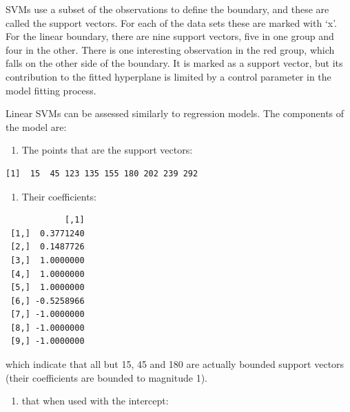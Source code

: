 \documentclass[
  letterpaper,
]{krantz}
\newenvironment{Shaded}{\begin{snugshade}}{\end{snugshade}}
\newcommand{\NormalTok}[1]{\textcolor[rgb]{0.00,0.23,0.31}{#1}}
\newcommand{\SpecialCharTok}[1]{\textcolor[rgb]{0.37,0.37,0.37}{#1}}
\providecommand{\tightlist}{%
  \setlength{\itemsep}{0pt}\setlength{\parskip}{0pt}}
\begin{document}
SVMs use a subset of the observations to define the boundary, and these
are called the support vectors. For each of the data sets these are
marked with `x'. For the linear boundary, there are nine support
vectors, five in one group and four in the other. There is one
interesting observation in the red group, which falls on the other side
of the boundary. It is marked as a support vector, but its contribution
to the fitted hyperplane is limited by a control parameter in the model
fitting process.

Linear SVMs can be assessed similarly to regression models. The
components of the model are:

\begin{enumerate}
\def\labelenumi{\arabic{enumi}.}
\tightlist
\item
  The points that are the support vectors:
\end{enumerate}

\begin{Shaded}
\end{Shaded}

\begin{verbatim}
[1]  15  45 123 135 155 180 202 239 292
\end{verbatim}

\begin{enumerate}
\def\labelenumi{\arabic{enumi}.}
\setcounter{enumi}{1}
\tightlist
\item
  Their coefficients:
\end{enumerate}

\begin{Shaded}
\end{Shaded}

\begin{verbatim}
            [,1]
 [1,]  0.3771240
 [2,]  0.1487726
 [3,]  1.0000000
 [4,]  1.0000000
 [5,]  1.0000000
 [6,] -0.5258966
 [7,] -1.0000000
 [8,] -1.0000000
 [9,] -1.0000000
\end{verbatim}

which indicate that all but 15, 45 and 180 are actually bounded support
vectors (their coefficients are bounded to magnitude 1).

\begin{enumerate}
\def\labelenumi{\arabic{enumi}.}
\setcounter{enumi}{2}
\tightlist
\item
  that when used with the intercept:
\end{enumerate}
\end{document}
